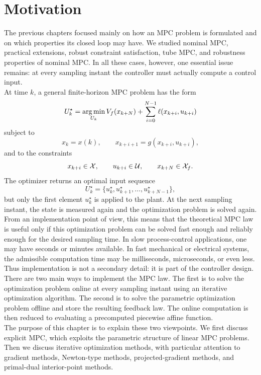\section{Motivation}

The previous chapters focused mainly on how an MPC problem is formulated and on which
properties its closed loop may have. We studied nominal MPC, practical extensions, robust
constraint satisfaction, tube MPC, and robustness properties of nominal MPC. In all these cases,
however, one essential issue remains: at every sampling instant the controller must actually
compute a control input.\\
At time \(k\), a general finite-horizon MPC problem has the form
\[
    U_k^\star
    =
    \operatorname*{arg\,min}_{U_k}
    V_f(x_{k+N})
    +
    \sum_{i=0}^{N-1} \ell(x_{k+i},u_{k+i})
\]
subject to
\[
    x_k = x(k),
    \qquad
    x_{k+i+1}=g(x_{k+i},u_{k+i}),
\]
and to the constraints
\[
    x_{k+i}\in \mathcal{X},\qquad u_{k+i}\in \mathcal{U},
    \qquad
    x_{k+N}\in \mathcal{X}_f .
\]
The optimizer returns an optimal input sequence
\[
    U_k^\star
    =
    \{u_k^\star,u_{k+1}^\star,\ldots,u_{k+N-1}^\star\},
\]
but only the first element \(u_k^\star\) is applied to the plant. At the next sampling instant,
the state is measured again and the optimization problem is solved again.\\
From an implementation point of view, this means that the theoretical MPC law is useful only
if this optimization problem can be solved fast enough and reliably enough for the desired
sampling time. In slow process-control applications, one may have seconds or minutes available.
In fast mechanical or electrical systems, the admissible computation time may be milliseconds,
microseconds, or even less. Thus implementation is not a secondary detail: it is part of the
controller design.\\

There are two main ways to implement the MPC law. The first is to solve the optimization
problem online at every sampling instant using an iterative optimization algorithm. The second
is to solve the parametric optimization problem offline and store the resulting feedback law.
The online computation is then reduced to evaluating a precomputed piecewise affine function.\\

The purpose of this chapter is to explain these two viewpoints. We first discuss explicit MPC,
which exploits the parametric structure of linear MPC problems. Then we discuss iterative
optimization methods, with particular attention to gradient methods, Newton-type methods,
projected-gradient methods, and primal-dual interior-point methods.

